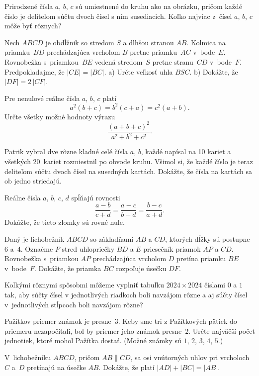 {%
Prirodzené čísla $a$, $b$, $c$ sú umiestnené do kruhu ako na obrázku, pričom každé číslo je deliteľom súčtu dvoch čísel s ním susediacich. Koľko najviac z~čísel $a$, $b$, $c$ môže byť rôznych?
%
}

{%
Nech $ABCD$ je obdĺžnik so stredom $S$ a dlhšou stranou $AB$. Kolmica na priamku~$BD$ prechádzajúca
vrcholom $B$ pretne priamku~$AC$ v~bode~$E$. Rovnobežka s~priamkou~$BE$ vedená stredom~$S$ pretne stranu~$CD$ v~bode~$F$. Predpokladajme, že $|CE|=|BC|$.
\ite a) Určte veľkosť uhla $BSC$.
\ite b) Dokážte, že $|DF|=2\,|CF|$.
}

{%
Pre nenulové reálne čísla $a$, $b$, $c$ platí
$$
a^2(b+c)=b^2(c+a)=c^2(a+b).
$$
Určte všetky možné hodnoty výrazu
$$
\frac{(a+b+c)^2}{a^2+b^2+c^2}.
$$
}

{%
Patrik vybral dve rôzne kladné celé čísla $a$, $b$, každé napísal na 10 kariet a všetkých 20~kariet rozmiestnil po obvode kruhu.
Všimol si, že každé číslo je teraz deliteľom súčtu dvoch čísel na susedných kartách.
Dokážte, že čísla na kartách sa ob jedno striedajú.}

{%
Reálne čísla $a$, $b$, $c$, $d$ spĺňajú rovnosti
$$
\frac{a-b}{c+d} = \frac{a-c}{b+d} = \frac{b-c}{a+d}.
$$
Dokážte, že tieto zlomky sú rovné nule.}

{%
Daný je lichobežník $ABCD$ so základňami $AB$ a $CD$, ktorých dĺžky sú postupne 6 a~4. Označme $P$ stred uhlopriečky $BD$ a $E$ priesečník priamok $AP$ a $CD$. Rovnobežka s~priamkou $AP$ prechádzajúca vrcholom $D$ pretína priamku $BE$ v~bode~$F$. Dokážte, že priamka $BC$ rozpoľuje úsečku $DF$.}

{%
Koľkými rôznymi spôsobmi môžeme vyplniť tabuľku $2024 \times 2024$ číslami $0$ a $1$ tak, aby súčty čísel v jednotlivých riadkoch boli navzájom rôzne a aj súčty čísel v~jednotlivých stĺpcoch boli navzájom rôzne?}

{%
Pažítkov priemer známok je presne~$3$. Keby sme tri z Pažítkových pätiek do priemeru nezapočítali, bol by priemer jeho známok presne~$2$. Určte najväčší počet jednotiek, ktoré mohol Pažítka dostať. (Možné známky sú $1$, $2$, $3$, $4$, $5$.)}

{%
V~lichobežníku $ABCD$, pričom $AB \parallel CD$, sa osi vnútorných uhlov pri vrcholoch $C$ a~$D$ pretínajú na úsečke $AB$. Dokážte, že platí $|AD|+|BC|=|AB|$.}

